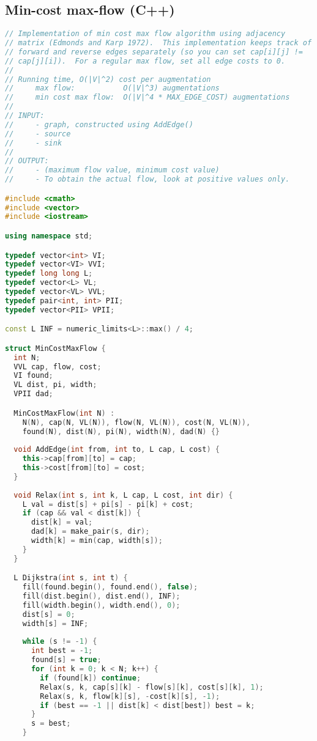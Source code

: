 \subsection{Min-cost max-flow (C++)}
\begin{lstlisting}[language=C++]
// Implementation of min cost max flow algorithm using adjacency
// matrix (Edmonds and Karp 1972).  This implementation keeps track of
// forward and reverse edges separately (so you can set cap[i][j] !=
// cap[j][i]).  For a regular max flow, set all edge costs to 0.
//
// Running time, O(|V|^2) cost per augmentation
//     max flow:           O(|V|^3) augmentations
//     min cost max flow:  O(|V|^4 * MAX_EDGE_COST) augmentations
//     
// INPUT: 
//     - graph, constructed using AddEdge()
//     - source
//     - sink
//
// OUTPUT:
//     - (maximum flow value, minimum cost value)
//     - To obtain the actual flow, look at positive values only.

#include <cmath>
#include <vector>
#include <iostream>

using namespace std;

typedef vector<int> VI;
typedef vector<VI> VVI;
typedef long long L;
typedef vector<L> VL;
typedef vector<VL> VVL;
typedef pair<int, int> PII;
typedef vector<PII> VPII;

const L INF = numeric_limits<L>::max() / 4;

struct MinCostMaxFlow {
  int N;
  VVL cap, flow, cost;
  VI found;
  VL dist, pi, width;
  VPII dad;

  MinCostMaxFlow(int N) : 
    N(N), cap(N, VL(N)), flow(N, VL(N)), cost(N, VL(N)), 
    found(N), dist(N), pi(N), width(N), dad(N) {}
  
  void AddEdge(int from, int to, L cap, L cost) {
    this->cap[from][to] = cap;
    this->cost[from][to] = cost;
  }
  
  void Relax(int s, int k, L cap, L cost, int dir) {
    L val = dist[s] + pi[s] - pi[k] + cost;
    if (cap && val < dist[k]) {
      dist[k] = val;
      dad[k] = make_pair(s, dir);
      width[k] = min(cap, width[s]);
    }
  }

  L Dijkstra(int s, int t) {
    fill(found.begin(), found.end(), false);
    fill(dist.begin(), dist.end(), INF);
    fill(width.begin(), width.end(), 0);
    dist[s] = 0;
    width[s] = INF;
    
    while (s != -1) {
      int best = -1;
      found[s] = true;
      for (int k = 0; k < N; k++) {
        if (found[k]) continue;
        Relax(s, k, cap[s][k] - flow[s][k], cost[s][k], 1);
        Relax(s, k, flow[k][s], -cost[k][s], -1);
        if (best == -1 || dist[k] < dist[best]) best = k;
      }
      s = best;
    }


\end{lstlisting}
